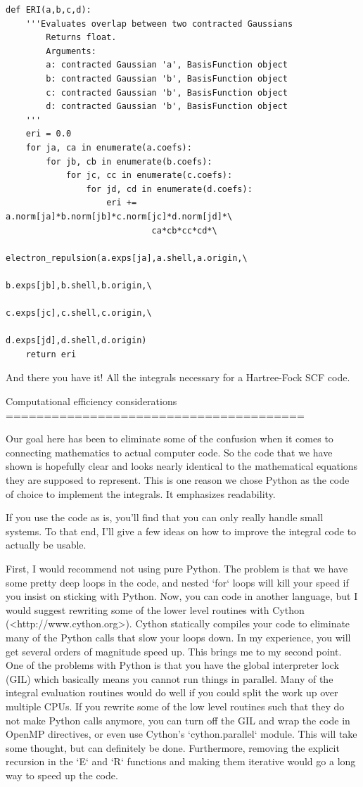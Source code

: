 \begin{lstlisting}[style=MyPython]
def ERI(a,b,c,d):
    '''Evaluates overlap between two contracted Gaussians
        Returns float.
        Arguments:
        a: contracted Gaussian 'a', BasisFunction object
        b: contracted Gaussian 'b', BasisFunction object
        c: contracted Gaussian 'b', BasisFunction object
        d: contracted Gaussian 'b', BasisFunction object
    '''
    eri = 0.0
    for ja, ca in enumerate(a.coefs):
        for jb, cb in enumerate(b.coefs):
            for jc, cc in enumerate(c.coefs):
                for jd, cd in enumerate(d.coefs):
                    eri += a.norm[ja]*b.norm[jb]*c.norm[jc]*d.norm[jd]*\
                             ca*cb*cc*cd*\
                             electron_repulsion(a.exps[ja],a.shell,a.origin,\
                                                b.exps[jb],b.shell,b.origin,\
                                                c.exps[jc],c.shell,c.origin,\
                                                d.exps[jd],d.shell,d.origin)
    return eri
\end{lstlisting}

And there you have it! All the integrals necessary for a Hartree-Fock
SCF code.

Computational efficiency considerations 
=======================================

Our goal here has been to eliminate some of the confusion when it comes
to connecting mathematics to actual computer code. So the code that we
have shown is hopefully clear and looks nearly identical to the
mathematical equations they are supposed to represent. This is one
reason we chose Python as the code of choice to implement the
integrals. It emphasizes readability.

If you use the code as is, you'll find that you can only really handle
small systems. To that end, I'll give a few ideas on how to improve the
integral code to actually be usable.

First, I would recommend not using pure Python. The problem is that we
have some pretty deep loops in the code, and nested `for` loops will
kill your speed if you insist on sticking with Python. Now, you can
code in another language, but I would suggest rewriting some of the
lower level routines with Cython (<http://www.cython.org>). Cython
statically compiles your code to eliminate many of the Python calls
that slow your loops down. In my experience, you will get several orders
of magnitude speed up. This brings me to my second point. One of the
problems with Python is that you have the global interpreter lock
(GIL) which basically means you cannot run things in parallel. Many of
the integral evaluation routines would do well if you could split the
work up over multiple CPUs. If you rewrite some of the low level
routines such that they do not make Python calls anymore, you can turn
off the GIL and wrap the code in OpenMP directives, or even use Cython's `cython.parallel` module. This will take some thought, but
can definitely be done. Furthermore, removing the explicit recursion in the 
`E` and `R` functions and making them iterative would go a long way to speed 
up the code.


